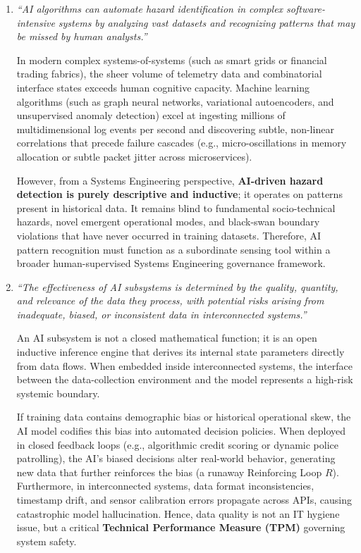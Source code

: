 \begin{enumerate}[label=(\alph*), itemsep=6pt]
    \item \textit{``AI algorithms can automate hazard identification in complex software-intensive systems by analyzing vast datasets and recognizing patterns that may be missed by human analysts.''}
    \begin{tcolorbox}[colback=white,colframe=sePrimary,title={\small \textbf{Model Analysis 2(c):}}]
    In modern complex systems-of-systems (such as smart grids or financial trading fabrics), the sheer volume of telemetry data and combinatorial interface states exceeds human cognitive capacity. Machine learning algorithms (such as graph neural networks, variational autoencoders, and unsupervised anomaly detection) excel at ingesting millions of multidimensional log events per second and discovering subtle, non-linear correlations that precede failure cascades (e.g., micro-oscillations in memory allocation or subtle packet jitter across microservices).
    
    However, from a Systems Engineering perspective, \textbf{AI-driven hazard detection is purely descriptive and inductive}; it operates on patterns present in historical data. It remains blind to fundamental socio-technical hazards, novel emergent operational modes, and black-swan boundary violations that have never occurred in training datasets. Therefore, AI pattern recognition must function as a subordinate sensing tool within a broader human-supervised Systems Engineering governance framework.
    \end{tcolorbox}

    \item \textit{``The effectiveness of AI subsystems is determined by the quality, quantity, and relevance of the data they process, with potential risks arising from inadequate, biased, or inconsistent data in interconnected systems.''}
    \begin{tcolorbox}[colback=white,colframe=sePrimary,title={\small \textbf{Model Analysis 2(d):}}]
    An AI subsystem is not a closed mathematical function; it is an open inductive inference engine that derives its internal state parameters directly from data flows. When embedded inside interconnected systems, the interface between the data-collection environment and the model represents a high-risk systemic boundary.
    
    If training data contains demographic bias or historical operational skew, the AI model codifies this bias into automated decision policies. When deployed in closed feedback loops (e.g., algorithmic credit scoring or dynamic police patrolling), the AI's biased decisions alter real-world behavior, generating new data that further reinforces the bias (a runaway Reinforcing Loop $R$). Furthermore, in interconnected systems, data format inconsistencies, timestamp drift, and sensor calibration errors propagate across APIs, causing catastrophic model hallucination. Hence, data quality is not an IT hygiene issue, but a critical \textbf{Technical Performance Measure (TPM)} governing system safety.
    \end{tcolorbox}
\end{enumerate}

